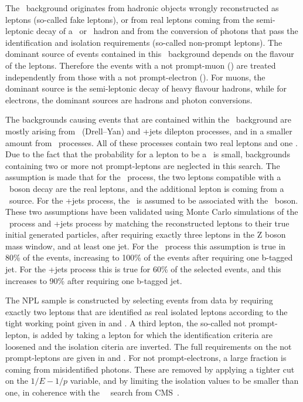 The \NPL\ background  originates from hadronic objects wrongly reconstructed as leptons (so-called fake leptons), or from real leptons coming from the semi-leptonic decay of a \Pbottom\ or \Pcharm\ hadron and from the conversion of photons that pass the identification and isolation requirements (so-called non-prompt leptons). The dominant source of events contained in this \NPL\ background  depends on the flavour of the leptons. Therefore the events with a not prompt-muon (\NPM) are treated independently from those with a not prompt-electron (\NPE). For muons, the dominant source is the semi-leptonic decay of heavy flavour hadrons, while for electrons, the dominant sources are hadrons and photon conversions. 

The backgrounds causing events that are contained within the \NPL\ background  are mostly arising from \DY\ (Drell--Yan) and \ttbar+jets dilepton processes, and in a smaller amount from \WW\ processes. All of these processes contain two real leptons and one \NPL. Due to the fact that the probability for a lepton to be a \NPL\ is small, backgrounds containing two or more  not prompt-leptons are neglected in this search. The assumption is made that for the \DY\ process, the two leptons compatible with a \PZ\ boson decay are the real leptons, and the additional lepton is coming from a \NPL\ source. For the \ttbar+jets process, the \NPL\ is assumed to be associated with the \PZ\ boson. These two assumptions have been validated using Monte Carlo simulations of the \DY\ process and \ttbar+jets process by matching the reconstructed leptons to their true initial generated particles, after requiring exactly three leptons in the Z boson mass window, and at least one jet. For the \DY\ process this assumption is true in 80\% of the events, increasing to 100\% of the events after requiring one b-tagged jet. For the \ttbar+jets process this is true for 60\% of the selected events, and this increases to 90\% after requiring one b-tagged jet.

The NPL sample is constructed by selecting events from data by requiring exactly  two leptons that are identified as real isolated leptons according to the tight working point given in  and . A third lepton, the so-called not prompt-lepton,  is added by taking a lepton for which the identification criteria are loosened and the isolation citeria are inverted. The full  requirements on the not prompt-leptons are given in  and . For not prompt-electrons, a large fraction is coming from misidentified photons. These are removed by applying a tighter cut on the $1/E-1/p$ variable, and by limiting the isolation values to be smaller than one, in coherence with the \SM\ \tZq\ search from CMS~\cite{CMS-PAS-TOP-16-020}. 

